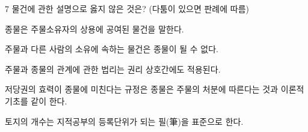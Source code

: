 \begin{question}{7}
물건에 관한 설명으로 옳지 않은 것은? (다툼이 있으면 판례에 따름)
\begin{choices}
  \item 종물은 주물소유자의 상용에 공여된 물건을 말한다.
  \item 주물과 다른 사람의 소유에 속하는 물건은 종물이 될 수 없다.
  \item 주물과 종물의 관계에 관한 법리는 권리 상호간에도 적용된다.
  \item 저당권의 효력이 종물에 미친다는 규정은 종물은 주물의 처분에 따른다는 것과 이론적 기초를 같이 한다.
  \item 토지의 개수는 지적공부의 등록단위가 되는 필(筆)을 표준으로 한다.
\end{choices}
\end{question}
